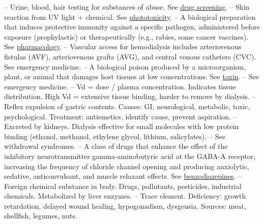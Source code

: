 -- Urine, blood, hair testing for substances of abuse. See \hyperlink{Drug Screening}{drug screening}.
-- Skin reaction from UV light + chemical. See \hyperlink{Phototoxicity}{phototoxicity}.
-- A biological preparation that induces protective immunity against a specific pathogen, administered before exposure (prophylactic) or therapeutically (e.g., rabies, some cancer vaccines). See \hyperlink{Pharmacology}{pharmacology}.
-- Vascular access for hemodialysis includes arteriovenous fistulas (AVF), arteriovenous grafts (AVG), and central venous catheters (CVC). See emergency medicine.
-- A biological poison produced by a microorganism, plant, or animal that damages host tissues at low concentrations. See \hyperlink{Toxin}{toxin}.
-- See emergency medicine.
-- Vd = dose / plasma concentration. Indicates tissue distribution. High Vd = extensive tissue binding, harder to remove by dialysis.
-- Reflex expulsion of gastric contents. Causes: GI, neurological, metabolic, toxic, psychological. Treatment: antiemetics, identify cause, prevent aspiration.
-- Excreted by kidneys. Dialysis effective for small molecules with low protein binding (ethanol, methanol, ethylene glycol, lithium, salicylates).
-- See withdrawal syndromes.
-- A class of drugs that enhance the effect of the inhibitory neurotransmitter gamma-aminobutyric acid at the GABA-A receptor, increasing the frequency of chloride channel opening and producing anxiolytic, sedative, anticonvulsant, and muscle relaxant effects. See \hyperlink{Benzodiazepines}{benzodiazepines}.
-- Foreign chemical substance in body. Drugs, pollutants, pesticides, industrial chemicals. Metabolized by liver enzymes.
-- Trace element. Deficiency: growth retardation, delayed wound healing, hypogonadism, dysgeusia. Sources: meat, shellfish, legumes, nuts.
